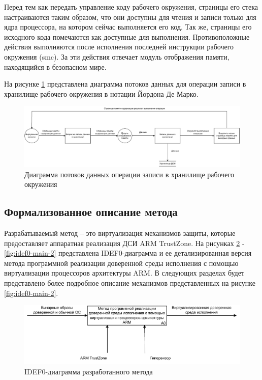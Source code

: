Перед тем как передать управление коду рабочего окружения, страницы его стека настраиваются таким образом, что они доступны для чтения и записи только для ядра процессора, на котором сейчас выполняется его код. Так же, страницы его исходного кода помечаются как доступные для выполнения. Противоположные действия выполняются после исполнения последней инструкции рабочего окружения (smc). За эти действия отвечает модуль отображения памяти, находящийся в безопасном мире.

На рисунке \ref{fig:ciee} представлена диаграмма потоков данных для операции записи в хранилище рабочего окружения в нотации Йордона-Де Марко.

\begin{figure}[h]
	\centering
	\includegraphics[width=\textwidth]{img/dfd-ciee.pdf}
	\caption{Диаграмма потоков данных операции записи в хранилище рабочего окружения}
	\label{fig:ciee}
\end{figure}

\subsection{Формализованное описание метода}

Разрабатываемый метод -- это виртуализация механизмов защиты, которые предоставляет аппаратная реализация ДСИ ARM TrustZone. На рисунках \ref{fig:idef0-main-1} - \ref{fig:idef0-main-2} представлена IDEF0-диаграмма и ее детализированная версия метода программной реализации доверенной среды исполнения с помощью виртуализации процессоров архитектуры ARM. В следующих разделах будет представлено более подробное описание механизмов представленных на рисунке \ref{fig:idef0-main-2}.

\begin{figure}[h]
	\centering
	\includegraphics[width=\textwidth]{img/main-idef0-1.pdf}
	\caption{IDEF0-диаграмма разработанного метода}
	\label{fig:idef0-main-1}
\end{figure}


